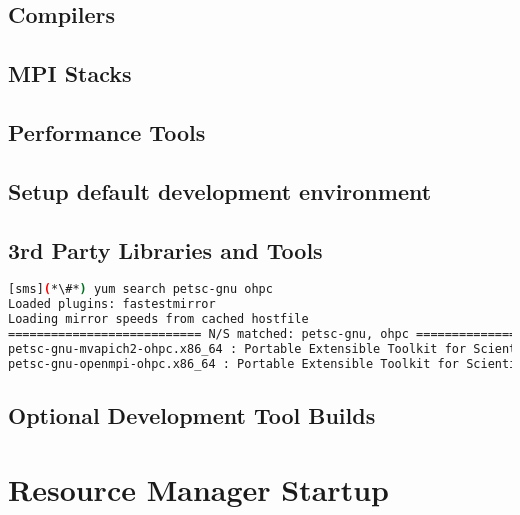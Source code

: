 \documentclass[letterpaper]{article}
\begin{document}
\vspace*{-0.15cm}
\subsection{Compilers} \label{sec:install_compilers}


\subsection{MPI Stacks} \label{sec:mpi}


\subsection{Performance Tools} \label{sec:install_perf_tools}


\subsection{Setup default development environment}


\subsection{3rd Party Libraries and Tools} \label{sec:3rdparty}



\begin{lstlisting}[language=bash,keywords={}]
[sms](*\#*) yum search petsc-gnu ohpc
Loaded plugins: fastestmirror
Loading mirror speeds from cached hostfile
=========================== N/S matched: petsc-gnu, ohpc ===========================
petsc-gnu-mvapich2-ohpc.x86_64 : Portable Extensible Toolkit for Scientific Computation
petsc-gnu-openmpi-ohpc.x86_64 : Portable Extensible Toolkit for Scientific Computation
\end{lstlisting}



\subsection{Optional Development Tool Builds} \label{sec:3rdparty_intel}


\section{Resource Manager Startup} \label{sec:rms_startup}

\end{document}
